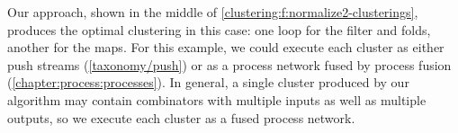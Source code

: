 Our approach, shown in the middle of \cref{clustering:f:normalize2-clusterings}, produces the optimal clustering in this case: one loop for the filter and folds, another for the maps.
For this example, we could execute each cluster as either push streams (\cref{taxonomy/push}) or as a process network fused by process fusion (\cref{chapter:process:processes}).
In general, a single cluster produced by our algorithm may contain combinators with multiple inputs as well as multiple outputs, so we execute each cluster as a fused process network.




